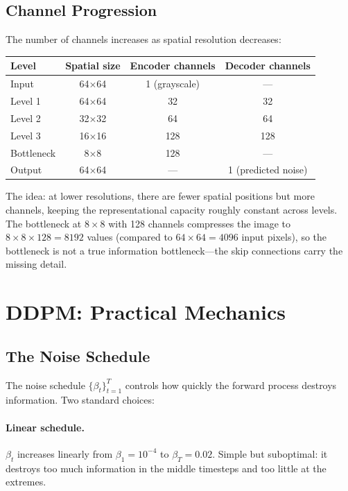 \documentclass[11pt]{article}
\begin{document}
\subsection{Channel Progression}

The number of channels increases as spatial resolution decreases:

\begin{center}
\begin{tabular}{lccc}
\toprule
Level & Spatial size & Encoder channels & Decoder channels \\
\midrule
Input & 64$\times$64 & 1 (grayscale) & --- \\
Level 1 & 64$\times$64 & 32 & 32 \\
Level 2 & 32$\times$32 & 64 & 64 \\
Level 3 & 16$\times$16 & 128 & 128 \\
Bottleneck & 8$\times$8 & 128 & --- \\
Output & 64$\times$64 & --- & 1 (predicted noise) \\
\bottomrule
\end{tabular}
\end{center}

The idea: at lower resolutions, there are fewer spatial positions but more
channels, keeping the representational capacity roughly constant across levels.
The bottleneck at $8\times8$ with 128 channels compresses the image to
$8 \times 8 \times 128 = 8192$ values (compared to $64 \times 64 = 4096$ input
pixels), so the bottleneck is not a true information bottleneck---the skip
connections carry the missing detail.

\section{DDPM: Practical Mechanics}

\subsection{The Noise Schedule}

The noise schedule $\{\beta_t\}_{t=1}^T$ controls how quickly the forward process
destroys information. Two standard choices:

\paragraph{Linear schedule.}
$\beta_t$ increases linearly from $\beta_1 = 10^{-4}$ to $\beta_T = 0.02$.
Simple but suboptimal: it destroys too much information in the middle timesteps
and too little at the extremes.
\end{document}
